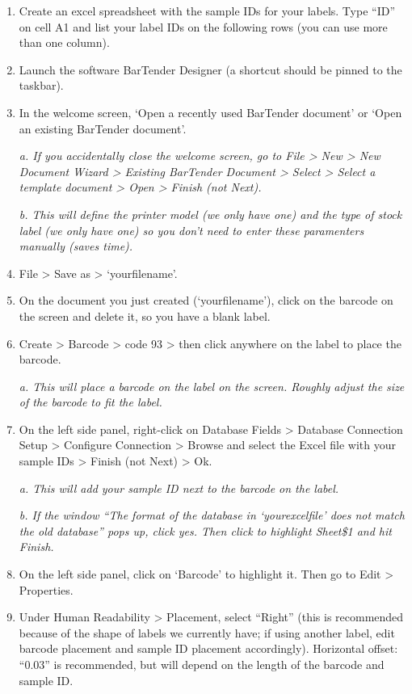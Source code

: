 \documentclass[
  letterpaper,
  DIV=11,
  numbers=noendperiod]{scrreprt}
\begin{document}
\begin{enumerate}
\def\labelenumi{\arabic{enumi}.}
\item
  Create an excel spreadsheet with the sample IDs for your labels. Type
  ``ID'' on cell A1 and list your label IDs on the following rows (you
  can use more than one column).
\item
  Launch the software BarTender Designer (a shortcut should be pinned to
  the taskbar).
\item
  In the welcome screen, `Open a recently used BarTender document' or
  `Open an existing BarTender document'.

  \emph{a. If you accidentally close the welcome screen, go to File
  \textgreater{} New \textgreater{} New Document Wizard \textgreater{}
  Existing BarTender Document \textgreater{} Select \textgreater{}
  Select a template document \textgreater{} Open \textgreater{} Finish
  (not Next).}

  \emph{b. This will define the printer model (we only have one) and the
  type of stock label (we only have one) so you don't need to enter
  these paramenters manually (saves time).}
\item
  File \textgreater{} Save as \textgreater{} `yourfilename'.
\item
  On the document you just created (`yourfilename'), click on the
  barcode on the screen and delete it, so you have a blank label.
\item
  Create \textgreater{} Barcode \textgreater{} code 93 \textgreater{}
  then click anywhere on the label to place the barcode.

  \emph{a. This will place a barcode on the label on the screen. Roughly
  adjust the size of the barcode to fit the label.}
\item
  On the left side panel, right-click on Database Fields \textgreater{}
  Database Connection Setup \textgreater{} Configure Connection
  \textgreater{} Browse and select the Excel file with your sample IDs
  \textgreater{} Finish (not Next) \textgreater{} Ok.

  \emph{a. This will add your sample ID next to the barcode on the
  label.}

  \emph{b. If the window ``The format of the database in `yourexcelfile'
  does not match the old database'' pops up, click yes. Then click to
  highlight Sheet\$1 and hit Finish.}
\item
  On the left side panel, click on `Barcode' to highlight it. Then go to
  Edit \textgreater{} Properties.
\item
  Under Human Readability \textgreater{} Placement, select ``Right''
  (this is recommended because of the shape of labels we currently have;
  if using another label, edit barcode placement and sample ID placement
  accordingly). Horizontal offset: ``0.03'' is recommended, but will
  depend on the length of the barcode and sample ID.


\end{enumerate}
\end{document}
